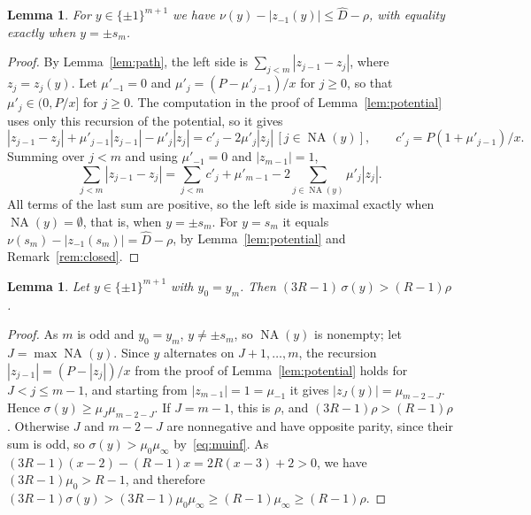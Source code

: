 \documentclass[11pt]{article}
\newtheorem{lemma}[theorem]{Lemma}
\theoremstyle{remark}
\newcommand{\NA}{\operatorname{NA}}
\begin{document}
\begin{lemma}\label{lem:noncorner}
For $y\in\{\pm1\}^{m+1}$ we have $\nu(y)-|z_{-1}(y)|\le\hat D-\rho$, with
equality exactly when $y=\pm s_m$.
\end{lemma}
\begin{proof}
By Lemma~\ref{lem:path}, the left side is $\sum_{j<m}|z_{j-1}-z_j|$, where
$z_j=z_j(y)$. Let $\mu'_{-1}=0$ and $\mu'_j=(P-\mu'_{j-1})/x$ for $j\ge0$, so
that $\mu'_j\in(0,P/x]$ for $j\ge0$. The computation in the proof of
Lemma~\ref{lem:potential} uses only this recursion of the potential, so it
gives
\[
|z_{j-1}-z_j|+\mu'_{j-1}|z_{j-1}|-\mu'_j|z_j|
=c'_j-2\mu'_j|z_j|\,[j\in\NA(y)],\qquad c'_j=P(1+\mu'_{j-1})/x.
\]
Summing over $j<m$ and using $\mu'_{-1}=0$ and $|z_{m-1}|=1$,
\[
\sum_{j<m}|z_{j-1}-z_j|=\sum_{j<m}c'_j+\mu'_{m-1}
-2\sum_{j\in\NA(y)}\mu'_j|z_j|.
\]
All terms of the last sum are positive, so the left side is maximal exactly
when $\NA(y)=\emptyset$, that is, when $y=\pm s_m$. For $y=s_m$ it equals
$\nu(s_m)-|z_{-1}(s_m)|=\hat D-\rho$, by Lemma~\ref{lem:potential} and
Remark~\ref{rem:closed}.
\end{proof}

\begin{lemma}\label{lem:paritydefect}
Let $y\in\{\pm1\}^{m+1}$ with $y_0=y_m$. Then $(3R-1)\,\sigma(y)>(R-1)\rho$.
\end{lemma}
\begin{proof}
As $m$ is odd and $y_0=y_m$, $y\ne\pm s_m$, so $\NA(y)$ is nonempty; let
$J=\max\NA(y)$. Since $y$ alternates on $J+1,\dots,m$, the recursion
$|z_{j-1}|=(P-|z_j|)/x$ from the proof of Lemma~\ref{lem:potential} holds for
$J<j\le m-1$, and starting from $|z_{m-1}|=1=\mu_{-1}$ it gives
$|z_J(y)|=\mu_{m-2-J}$. Hence $\sigma(y)\ge\mu_J\mu_{m-2-J}$. If $J=m-1$,
this is $\rho$, and $(3R-1)\rho>(R-1)\rho$. Otherwise $J$ and $m-2-J$ are
nonnegative and have opposite parity, since their sum is odd, so
$\sigma(y)>\mu_0\mu_\infty$ by~\eqref{eq:muinf}. As
$(3R-1)(x-2)-(R-1)x=2R(x-3)+2>0$, we have $(3R-1)\mu_0>R-1$, and therefore
$(3R-1)\sigma(y)>(3R-1)\mu_0\mu_\infty\ge(R-1)\mu_\infty\ge(R-1)\rho$.
\end{proof}
\end{document}
